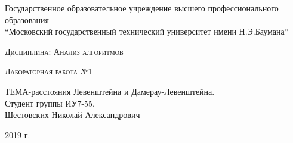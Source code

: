 \documentclass[a4paper,12pt]{report}
\begin{document}
    \begin{titlepage}

        \begin{center}
            \large
            Государственное образовательное учреждение высшего профессионального образования\\
            “Московский государственный технический университет имени Н.Э.Баумана”
            \vspace{3cm}
            
            \textsc{Дисциплина: Анализ алгоритмов}
            \vspace{0.5cm}
                
            \textsc{Лабораторная работа №1}
            \vspace{1.5cm}
            
            {\LARGE ТЕМА-расстояния Левенштейна и Дамерау-Левенштейна.\\}
            \vspace{1.5cm}
            Студент группы ИУ7-55,\\   
            Шестовских Николай Александрович
            \vfill
            
            2019 г.
            
            \end{center}

    \end{titlepage}
\tableofcontents
	
	\newpage
	
\end{document}
